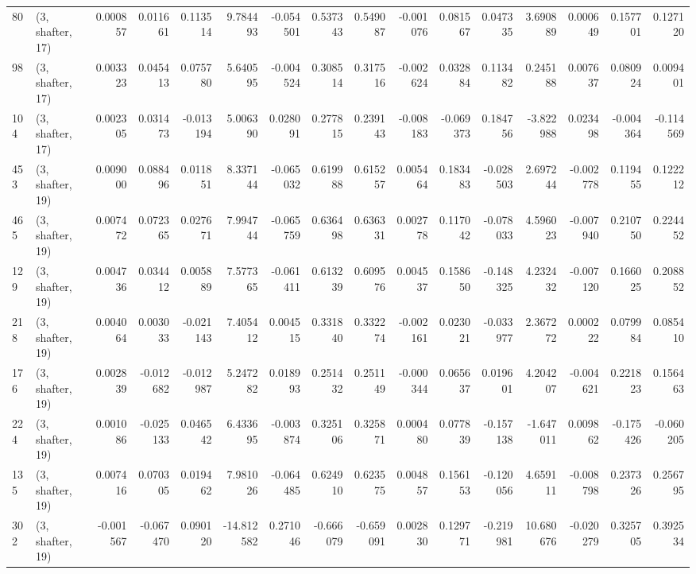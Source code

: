 \begin{tabular}{llrrrrrrrrrrrrrr}
80  &  (3, shafter, 17) &   0.000857 &  0.011661 &  0.113514 &   9.784493 & -0.054501 &   0.537343 &  0.549087 & -0.001076 &  0.081567 &  0.047335 &     3.690889 &   0.000649 &   0.157701 &   0.127120 \\
98  &  (3, shafter, 17) &   0.003323 &  0.045413 &  0.075780 &   5.640595 & -0.004524 &   0.308514 &  0.317516 & -0.002624 &  0.032884 &  0.113482 &     0.245188 &   0.007637 &   0.080924 &   0.009401 \\
104 &  (3, shafter, 17) &   0.002305 &  0.031473 & -0.013194 &   5.006390 &  0.028091 &   0.277815 &  0.239143 & -0.008183 & -0.069373 &  0.184756 &    -3.822988 &   0.023498 &  -0.004364 &  -0.114569 \\
453 &  (3, shafter, 19) &   0.009000 &  0.088496 &  0.011851 &   8.337144 & -0.065032 &   0.619988 &  0.615257 &  0.005464 &  0.183483 & -0.028503 &     2.697244 &  -0.002778 &   0.119455 &   0.122212 \\
465 &  (3, shafter, 19) &   0.007472 &  0.072365 &  0.027671 &   7.994744 & -0.065759 &   0.636498 &  0.636331 &  0.002778 &  0.117042 & -0.078033 &     4.596023 &  -0.007940 &   0.210750 &   0.224452 \\
129 &  (3, shafter, 19) &   0.004736 &  0.034412 &  0.005889 &   7.577365 & -0.061411 &   0.613239 &  0.609576 &  0.004537 &  0.158650 & -0.148325 &     4.232432 &  -0.007120 &   0.166025 &   0.208852 \\
218 &  (3, shafter, 19) &   0.004064 &  0.003033 & -0.021143 &   7.405412 &  0.004515 &   0.331840 &  0.332274 & -0.002161 &  0.023021 & -0.033977 &     2.367272 &   0.000222 &   0.079984 &   0.085410 \\
176 &  (3, shafter, 19) &   0.002839 & -0.012682 & -0.012987 &   5.247282 &  0.018993 &   0.251432 &  0.251149 & -0.000344 &  0.065637 &  0.019601 &     4.204207 &  -0.004621 &   0.221823 &   0.156463 \\
224 &  (3, shafter, 19) &   0.001086 & -0.025133 &  0.046542 &   6.433695 & -0.003874 &   0.325106 &  0.325871 &  0.000480 &  0.077839 & -0.157138 &    -1.647011 &   0.009862 &  -0.175426 &  -0.060205 \\
135 &  (3, shafter, 19) &   0.007416 &  0.070305 &  0.019462 &   7.981026 & -0.064485 &   0.624910 &  0.623575 &  0.004857 &  0.156153 & -0.120056 &     4.659111 &  -0.008798 &   0.237326 &   0.256795 \\
302 &  (3, shafter, 19) &  -0.001567 & -0.067470 &  0.090120 & -14.812582 &  0.271046 &  -0.666079 & -0.659091 &  0.002830 &  0.129771 & -0.219981 &    10.680676 &  -0.020279 &   0.325705 &   0.392534 \\

\end{tabular}
